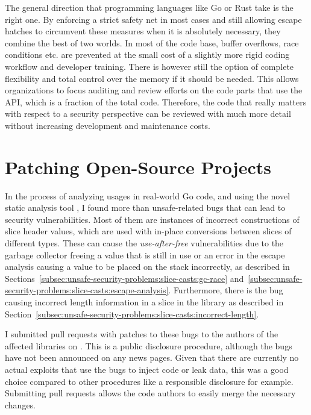 The general direction that programming languages like Go or Rust take is the right one.
By enforcing a strict safety net in most cases and still allowing escape hatches to circumvent these measures when it is
absolutely necessary, they combine the best of two worlds.
In most of the code base, buffer overflows, race conditions etc. are prevented at the small cost of a slightly more
rigid coding workflow and developer training.
There is however still the option of complete flexibility and total control over the memory if it should be needed.
This allows organizations to focus auditing and review efforts on the code parts that use the \unsafe{} \acrshort{API},
which is a fraction of the total code.
Therefore, the code that really matters with respect to a security perspective can be reviewed with much more detail
without increasing development and maintenance costs.



\section{Patching Open-Source Projects}\label{sec:discussion:patches}

In the process of analyzing \unsafe{} usages in real-world Go code, and using the novel static analysis tool
\toolSafer{}, I found more than \numberBugsFixedRounded{} unsafe-related bugs that can lead to security
vulnerabilities.
Most of them are instances of incorrect constructions of slice header values, which are used with in-place conversions
between slices of different types.
These can cause the \textit{use-after-free} vulnerabilities due to the garbage collector freeing a value that is still
in use or an error in the escape analysis causing a value to be placed on the stack incorrectly, as described in
Sections~\ref{subsec:unsafe-security-problems:slice-casts:gc-race}
and~\ref{subsec:unsafe-security-problems:slice-casts:escape-analysis}.
Furthermore, there is the bug causing incorrect length information in a slice in the \goFuse{} library as described in
Section~\ref{subsec:unsafe-security-problems:slice-casts:incorrect-length}.

I submitted \numberPRs{} pull requests with patches to these bugs to the authors of the affected libraries on
\github{}.
This is a public disclosure procedure, although the bugs have not been announced on any news pages.
Given that there are currently no actual exploits that use the bugs to inject code or leak data, this was a good choice
compared to other procedures like a responsible disclosure for example.
Submitting \github{} pull requests allows the code authors to easily merge the necessary changes.


